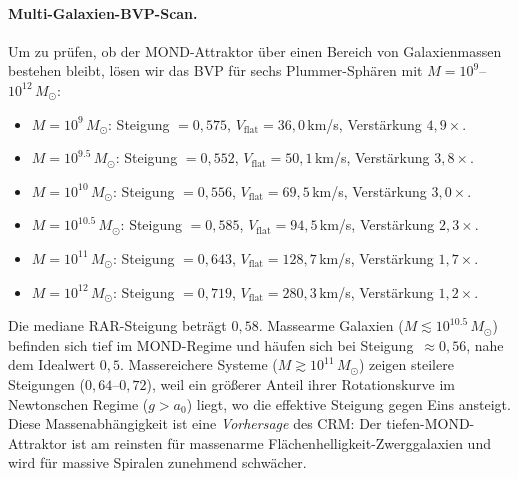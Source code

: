 \documentclass[aps,prd,twocolumn,superscriptaddress,nofootinbib]{revtex4-2}
\begin{document}
\paragraph{Multi-Galaxien-BVP-Scan.}
Um zu pr\"ufen, ob der MOND-Attraktor \"uber einen Bereich von Galaxienmassen bestehen bleibt, l\"osen wir das BVP f\"ur sechs Plummer-Sph\"aren mit $M = 10^9$--$10^{12}\,M_\odot$:
\begin{itemize}
\item $M = 10^{9}\,M_\odot$: Steigung $= 0{,}575$, $V_{\mathrm{flat}} = 36{,}0$\,km/s, Verst\"arkung $4{,}9\times$.
\item $M = 10^{9.5}\,M_\odot$: Steigung $= 0{,}552$, $V_{\mathrm{flat}} = 50{,}1$\,km/s, Verst\"arkung $3{,}8\times$.
\item $M = 10^{10}\,M_\odot$: Steigung $= 0{,}556$, $V_{\mathrm{flat}} = 69{,}5$\,km/s, Verst\"arkung $3{,}0\times$.
\item $M = 10^{10.5}\,M_\odot$: Steigung $= 0{,}585$, $V_{\mathrm{flat}} = 94{,}5$\,km/s, Verst\"arkung $2{,}3\times$.
\item $M = 10^{11}\,M_\odot$: Steigung $= 0{,}643$, $V_{\mathrm{flat}} = 128{,}7$\,km/s, Verst\"arkung $1{,}7\times$.
\item $M = 10^{12}\,M_\odot$: Steigung $= 0{,}719$, $V_{\mathrm{flat}} = 280{,}3$\,km/s, Verst\"arkung $1{,}2\times$.
\end{itemize}
Die mediane RAR-Steigung betr\"agt $0{,}58$. Massearme Galaxien ($M \lesssim 10^{10.5}\,M_\odot$) befinden sich tief im MOND-Regime und h\"aufen sich bei Steigung~$\approx 0{,}56$, nahe dem Idealwert $0{,}5$. Massereichere Systeme ($M \gtrsim 10^{11}\,M_\odot$) zeigen steilere Steigungen ($0{,}64$--$0{,}72$), weil ein gr\"o\ss{}erer Anteil ihrer Rotationskurve im Newtonschen Regime ($g > a_0$) liegt, wo die effektive Steigung gegen Eins ansteigt. Diese Massenabh\"angigkeit ist eine \textit{Vorhersage} des CRM: Der tiefen-MOND-Attraktor ist am reinsten f\"ur massenarme Fl\"achenhelligkeit-Zwerggalaxien und wird f\"ur massive Spiralen zunehmend schw\"acher.
\end{document}
